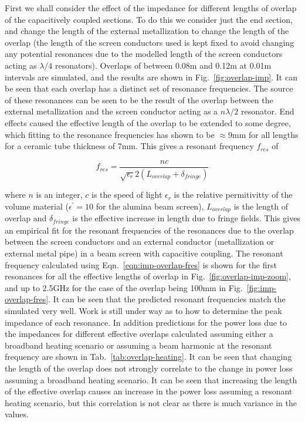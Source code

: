 First we shall consider the effect of the impedance for different lengths of overlap of the capacitively coupled sections. To do this we consider just the end section, and change the length of the external metallization to change the length of the overlap (the length of the screen conductors used is kept fixed to avoid changing any potential resonances due to the modelled length of the screen conductors acting as $\lambda /4$ resonators). Overlaps of between 0.08m and 0.12m at 0.01m intervals are simulated, and the results are shown in Fig.~\ref{fig:overlap-imp}. It can be seen that each overlap has a distinct set of resonance frequencies. The source of these resonances can be seen to be the result of the overlap between the external metallization and the screen conductor acting as a $n \lambda /2$ resonator. End effects caused the effective length of the overlap to be extended to some degree, which fitting to the resonance frequencies has shown to be $\approx 9$mm for all lengths for a ceramic tube thickness of 7mm. This gives a resonant frequency $f_{res}$ of

\begin{equation}
f_{res} = \frac{nc}{\sqrt{\epsilon_{r}}2 \left( L_{overlap} + \delta_{fringe} \right)}
\label{eqn:imp-overlap-fres}
\end{equation}

where $n$ is an integer, $c$ is the speed of light $\epsilon_{r}$ is the relative permitivitty of the volume material ($\epsilon^{'}=10$ for the alumina beam screen), $L_{overlap}$ is the length of overlap and $\delta_{fringe}$ is the effective increase in length due to fringe fields. This gives an empirical fit for the resonant frequencies of the resonances due to the overlap between the screen conductors and an external conductor (metallization or external metal pipe) in a beam screen with capacitive coupling. The resonant frequency calculated using Eqn.~\ref{eqn:imp-overlap-fres} is shown for the first resonances for all the effective lengths of overlap in Fig.~\ref{fig:overlap-imp-zoom}, and up to 2.5GHz for the case of the overlap being 100mm in Fig.~\ref{fig:imp-overlap-fres}. It can be seen that the predicted resonant frequencies match the simulated very well. Work is still under way as to how to determine the peak impedance of each resonance. In addition predictions for the power loss due to the impedances for different effective overlaps calculated assuming either a broadband heating scenario or assuming a beam harmonic at the resonant frequency are shown in Tab.~\ref{tab:overlap-heating}. It can be seen that changing the length of the overlap does not strongly correlate to the change in power loss assuming a broadband heating scenario. It can be seen that increasing the length of the effective overlap causes an increase in the power loss assuming a resonant heating scenario, but this correlation is not clear as there is much variance in the values.

